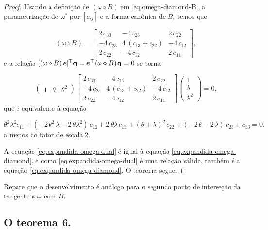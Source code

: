 \begin{proof}
Usando a definição de $(\omega\diamond B)$ em \ref{eq.omega-diamond-B}, a parametrização de $\omega^*$ por $[c_{ij}]$ e a forma canônica de $B$, temos que

\begin{equation*}
(\omega\diamond B)=
\begin{bmatrix}
2\,c_{33}&-4\,c_{23}&2\,c_{22}\\
-4\,c_{23}&4\,(c_{13}+c_{22})&-4\,c_{12}\\
2\,c_{22}&-4\,c_{12}&2\,c_{11}
\end{bmatrix},
\end{equation*}
e a relação $[(\omega\diamond B)\,\boldsymbol{e}]^\top {\bf q}=\boldsymbol{e}^\top (\omega\diamond B)\,{\bf q}=0$ se torna

\begin{equation*}
\begin{pmatrix}
1&\theta&\theta^2
\end{pmatrix}
\begin{bmatrix}
2\,c_{33}&-4\,c_{23}&2\,c_{22}\\
-4\,c_{23}&4\,(c_{13}+c_{22})&-4\,c_{12}\\
2\,c_{22}&-4\,c_{12}&2\,c_{11}
\end{bmatrix}
\begin{pmatrix}
1\\
\lambda\\
\lambda^2
\end{pmatrix}
=0,
\end{equation*}
que é equivalente à equação

\begin{equation}\label{eq.expandida-omega-diamond}
\theta^2\lambda^2 c_{11}+(-2\,\theta^2\,\lambda-2\,\theta\lambda^2)\,c_{12}+2\,\theta\lambda\,c_{13}+(\theta+\lambda)^2\,c_{22}+(-2\,\theta-2\,\lambda)\,c_{23}+c_{33}=0,
\end{equation}
a menos do fator de escala 2.

A equação \ref{eq.expandida-omega-dual} é igual à equação \ref{eq.expandida-omega-diamond}, e como 
\ref{eq.expandida-omega-dual} é uma relação válida, também é a equação \ref{eq.expandida-omega-diamond}. O teorema segue.
\end{proof}
Repare que o desenvolvimento é análogo para o segundo ponto de interseção da tangente à $\omega$ com $B$.


\subsection{O teorema 6.}\label{sec.teorema-6}

